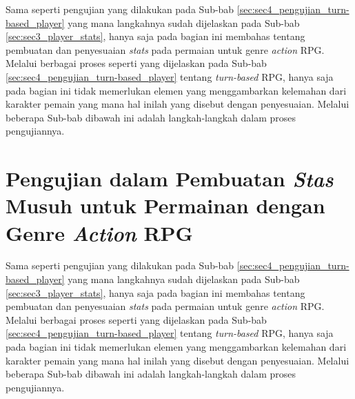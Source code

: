 Sama seperti pengujian yang dilakukan pada Sub-bab \ref{sec:sec4_pengujian_turn-based_player} yang mana langkahnya sudah dijelaskan pada Sub-bab \ref{sec:sec3_player_stats}, hanya saja pada bagian ini membahas tentang pembuatan dan penyesuaian \textit{stats} pada permaian untuk genre \textit{action} RPG. Melalui berbagai proses seperti yang dijelaskan pada Sub-bab \ref{sec:sec4_pengujian_turn-based_player} tentang \textit{turn-based} RPG, hanya saja pada bagian ini tidak memerlukan elemen yang menggambarkan kelemahan dari karakter pemain yang mana hal inilah yang disebut dengan penyesuaian. Melalui beberapa Sub-bab dibawah ini adalah langkah-langkah dalam proses pengujiannya.
\vspace{1ex}

\section{Pengujian dalam Pembuatan \textit{Stas} Musuh untuk Permainan dengan Genre \textit{Action} RPG}
\label{sec:sec4_pengujian_enemy}
\vspace{1ex}

Sama seperti pengujian yang dilakukan pada Sub-bab \ref{sec:sec4_pengujian_turn-based_player} yang mana langkahnya sudah dijelaskan pada Sub-bab \ref{sec:sec3_player_stats}, hanya saja pada bagian ini membahas tentang pembuatan dan penyesuaian \textit{stats} pada permaian untuk genre \textit{action} RPG. Melalui berbagai proses seperti yang dijelaskan pada Sub-bab \ref{sec:sec4_pengujian_turn-based_player} tentang \textit{turn-based} RPG, hanya saja pada bagian ini tidak memerlukan elemen yang menggambarkan kelemahan dari karakter pemain yang mana hal inilah yang disebut dengan penyesuaian. Melalui beberapa Sub-bab dibawah ini adalah langkah-langkah dalam proses pengujiannya.